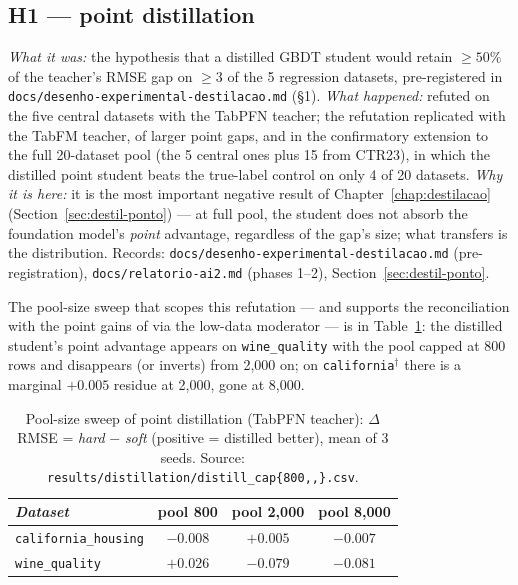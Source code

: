 \subsection{H1 --- point distillation}
\emph{What it was:} the hypothesis that a distilled GBDT student
would retain $\geq 50\%$ of the teacher's RMSE gap on $\geq 3$ of
the 5 regression datasets, pre-registered in
\texttt{docs/\allowbreak desenho-\allowbreak experimental-\allowbreak destilacao.\allowbreak md}
(\S1). \emph{What happened:} refuted on the five central datasets
with the TabPFN teacher; the refutation replicated with the TabFM
teacher, of larger point gaps, and in the confirmatory extension to
the full 20-dataset pool (the 5 central ones plus 15 from CTR23),
in which the distilled point
student beats the true-label control on only 4 of 20 datasets.
\emph{Why it is here:} it is the most important negative result of
Chapter~\ref{chap:destilacao} (Section~\ref{sec:destil-ponto}) ---
at full pool, the student does not absorb the foundation model's
\emph{point} advantage, regardless of the gap's size; what transfers
is the distribution. Records:
\texttt{docs/\allowbreak desenho-\allowbreak experimental-\allowbreak destilacao.\allowbreak md}
(pre-registration),
\texttt{docs/\allowbreak relatorio-\allowbreak ai2.\allowbreak md}
(phases 1--2), Section~\ref{sec:destil-ponto}.

The pool-size sweep that scopes this refutation --- and supports the
reconciliation with the point gains of \citet{jeong2026} via the
low-data moderator --- is in Table~\ref{tab:app-cap-sweep}: the
distilled student's point advantage appears on
\texttt{wine\_quality} with the pool capped at 800 rows and
disappears (or inverts) from 2{,}000 on; on
\texttt{california}$^\dagger$ there is a marginal $+0.005$ residue
at 2{,}000, gone at 8{,}000.

\begin{table}[htb]
\centering
\small
\caption[Pool-size sweep (point distillation)]{Pool-size sweep of
point distillation (TabPFN teacher): $\Delta$RMSE = \emph{hard} $-$
\emph{soft} (positive = distilled better), mean of 3 seeds. Source:
\texttt{results/\allowbreak distillation/\allowbreak distill\_\allowbreak cap\{800,,\}.\allowbreak csv}.}
\label{tab:app-cap-sweep}
\begin{tabular}{lccc}
\toprule
\emph{Dataset} & pool 800 & pool 2{,}000 & pool 8{,}000 \\
\midrule
\texttt{california\_\allowbreak housing} & $-0.008$ & $+0.005$ & $-0.007$ \\
\texttt{wine\_quality}       & $+0.026$ & $-0.079$ & $-0.081$ \\
\bottomrule
\end{tabular}
\end{table}

